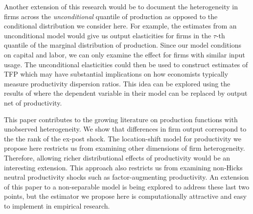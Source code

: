\documentclass[12pt]{article}
\begin{document}
Another extension of this research would be to document the heterogeneity in firms across the \textit{unconditional} quantile of production as opposed to the conditional distribution we consider here. For example, the estimates from an unconditional model would give us output elasticities for firms in the $\tau$-th quantile of the marginal distribution of production. Since our model conditions on capital and labor, we can only examine the effect for firms with similar input usage. The unconditional elasticities could then be used to construct estimates of TFP which may have substantial implications on how economists typically measure productivity dispersion ratios. This idea can be explored using the results of \cite{2009a} where the dependent variable in their model can be replaced by output net of productivity.

This paper contributes to the growing literature on production functions with unobserved heterogeneity. We show that differences in firm output correspond to the the rank of the ex-post shock. The location-shift model for productivity we propose here restricts us from examining other dimensions of firm heterogeneity. Therefore, allowing richer distributional effects of productivity would be an interesting extension. This approach also restricts us from examining non-Hicks neutral productivity shocks such as factor-augmenting productivity. An extension of this paper to a non-separable model is being explored to address these last two points, but the estimator we propose here is computationally attractive and easy to implement in empirical research.    

\pagebreak
\newpage









{}

\pagebreak
\newpage
\end{document}
